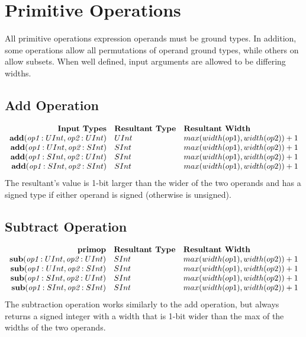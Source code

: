 \documentclass[12pt]{article}
\begin{document}
\section{Primitive Operations} \label{primitives}

All primitive operations expression operands must be ground types.
In addition, some operations allow all permutations of operand ground types, while others on allow subsets.
When well defined, input arguments are allowed to be differing widths.

\subsection{Add Operation}
\[
\begin{array}{rll}
\text{\bf Input Types} & \text{\bf Resultant Type} & \text{\bf Resultant Width} \\
\text{\bf add}(\text{\em op1}:UInt, \text{\em op2}:UInt) & UInt & max(width(op1),width(op2)) + 1 \\
\text{\bf add}(\text{\em op1}:UInt, \text{\em op2}:SInt) & SInt & max(width(op1),width(op2)) + 1 \\
\text{\bf add}(\text{\em op1}:SInt, \text{\em op2}:UInt) & SInt & max(width(op1),width(op2)) + 1 \\
\text{\bf add}(\text{\em op1}:SInt, \text{\em op2}:SInt) & SInt & max(width(op1),width(op2)) + 1 \\
\end{array}
\]
The resultant's value is 1-bit larger than the wider of the two operands and has a signed type if either operand is signed (otherwise is unsigned).

\subsection{Subtract Operation}
\[
\begin{array}{rll}
\text{\bf primop} & \text{\bf Resultant Type} & \text{\bf Resultant Width} \\
\text{\bf sub}(\text{\em op1}:UInt, \text{\em op2}:UInt) &  SInt & max(width(op1),width(op2)) + 1  \\
\text{\bf sub}(\text{\em op1}:UInt, \text{\em op2}:SInt) &  SInt & max(width(op1),width(op2)) + 1  \\
\text{\bf sub}(\text{\em op1}:SInt, \text{\em op2}:UInt) &  SInt & max(width(op1),width(op2)) + 1  \\
\text{\bf sub}(\text{\em op1}:SInt, \text{\em op2}:SInt) &  SInt & max(width(op1),width(op2)) + 1  \\
\end{array}
\]
The subtraction operation works similarly to the add operation, but always returns a signed integer with a width that is 1-bit wider than the max of the widths of the two operands.
\end{document}
